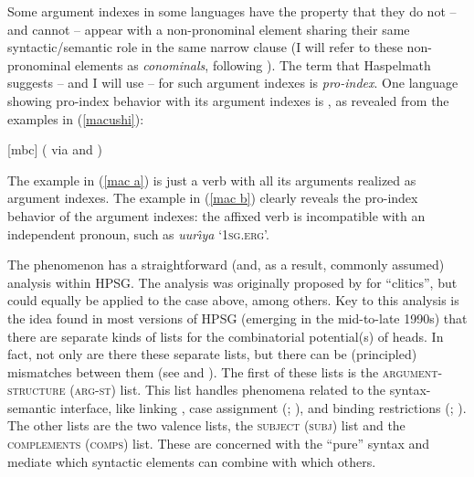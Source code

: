 \documentclass[output=paper,biblatex,babelshorthands,newtxmath,draftmode,colorlinks,citecolor=brown]{langscibook}
\begin{document}
\largerpage[-1]
Some argument indexes in some languages have the property that they do not -- and cannot -- appear
with a non-pronominal element sharing their same syntactic/semantic role in the same narrow clause
(I will refer to these non-pronominal elements as \emph{conominals}, following \citealt[]{haspelmath13}). The term that Haspelmath suggests -- and I will use -- for such argument indexes is \emph{pro-index}. One language showing pro-index behavior with its argument indexes is , as revealed from the examples in (\ref{macushi}): 
%
\begin{samepage}
\begin{exe}
\ex \label{macushi}  [mbc] (\citealt[]{abbott91} via \citealt[]{siewierska99} and \citealt[]{corbett03}) \nolistbreak
\begin{xlist}
\end{xlist}
\end{exe}
\end{samepage}
The example in (\ref{mac a}) is just a verb with all its arguments realized as argument indexes. The example in (\ref{mac b}) clearly reveals the pro-index behavior of the argument indexes: the affixed verb is incompatible with an independent pronoun, such as \textit{uur\^{\i}ya} `\textsc{1sg.erg}'. 

\largerpage[-1]
The  phenomenon has a straightforward (and, as a result, commonly assumed) analysis within HPSG. The analysis was originally proposed by \citet{MS97a-u} for  ``clitics'', but could equally be applied to the  case above, among others. Key to this analysis is the idea found in most versions of HPSG (emerging in the mid-to-late 1990s) that there are separate kinds of lists for the combinatorial potential(s) of heads. In fact, not only are there these separate lists, but there can be (principled) mismatches between them (see  and ). The first of these lists is the \textsc{argument-structure} (\textsc{arg-st}) list. This list handles phenomena related to the syntax-semantic interface, like linking \citep{Davis2001a-u}, case assignment (\citealt{Meurers99b,Prze99b}; ), and binding restrictions (\citealt{mannsag98,wecharka98}; ). The other lists are the two valence lists, the \textsc{subject} (\textsc{subj}) list and the \textsc{complements} (\textsc{comps}) list. These are concerned with the ``pure'' syntax and mediate which syntactic elements can combine with which others.
\end{document}
